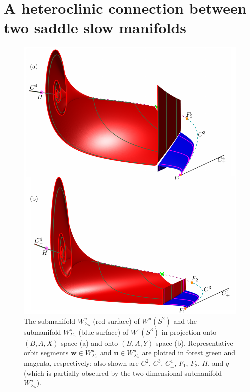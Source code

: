 \documentclass{ws-ijbc}
\begin{document}

\section{A heteroclinic connection between two saddle slow manifolds}

\begin{figure}[H]
\centering
\includegraphics[]{./figures/MKMO_9.pdf}
\caption{The submanifold $W^u_{\Sigma_5}$ (red surface) of $W^u(S^2)$ and the submanifold $W^s_{\Sigma_5}$ (blue surface) of $W^s(S^3)$ in projection onto $(B,A,X)$-space (a) and onto $(B,A,Y)$-space (b). Representative orbit segments $\mathbf{w} \in W^u_{\Sigma_5}$ and $\mathbf{u} \in W^u_{\Sigma_5}$ are plotted in forest green and magenta, respectively; also shown are $C^2$, $C^3$, $C^4_\pm$, $F_1$, $F_2$, $H$, and $q$ (which is partially obscured by the two-dimensional submanifold $W^u_{\Sigma_5}$). }
\label{figure_9}
\end{figure}
\end{document}
